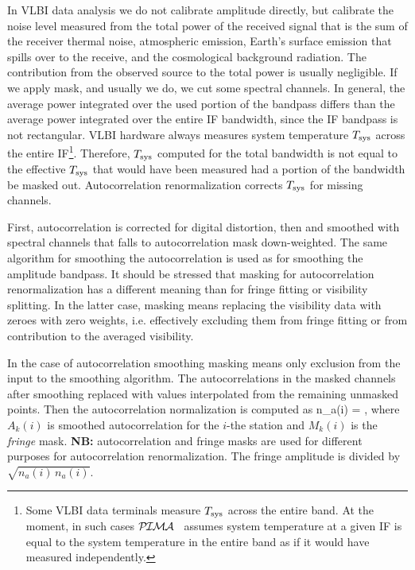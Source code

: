 \documentclass[11pt]{article}
\newcommand{\PIMA}{\textcolor{Dgreen}{$\cal P\hspace{-0.067em}I\hspace{-0.067em}M\hspace{-0.067em}A$} }
\begin{document}
  In VLBI data analysis we do not calibrate amplitude directly, but 
calibrate the noise level measured from the total power of the received 
signal that is the sum of the receiver thermal noise, atmospheric emission, 
Earth's surface emission that spills over to the receive, and the cosmological 
background radiation. The contribution from the observed source to the
total power is usually negligible. If we apply mask, and usually we do,
we cut some spectral channels. In general, the average power integrated 
over the used portion of the bandpass differs than the average power 
integrated over the entire IF bandwidth, since the IF bandpass is not 
rectangular. VLBI hardware always measures system temperature $T_{\rm sys}$ 
across the entire IF\footnote{Some VLBI data terminals measure $T_{\rm sys}$ 
across the entire band. At the moment, in such cases \PIMA\ assumes system 
temperature at a given IF is equal to the system temperature in the entire 
band as if it would have measured independently.}. Therefore, $T_{\rm sys}$ 
computed for the total bandwidth is not equal to the effective $T_{\rm sys}$ 
that would have been measured had a portion of the bandwidth be masked out. 
Autocorrelation renormalization corrects $T_{\rm sys}$ for missing channels.

  First, autocorrelation is corrected for digital distortion, then and 
smoothed with spectral channels that falls to autocorrelation mask down-weighted. 
The same algorithm for smoothing the autocorrelation is used as for smoothing 
the amplitude bandpass. It should be stressed that masking for autocorrelation
renormalization has a different meaning than for fringe fitting or visibility
splitting. In the latter case, masking means replacing the visibility
data with zeroes with zero weights, i.e. effectively excluding them from
fringe fitting or from contribution to the averaged visibility.

  In the case of autocorrelation smoothing masking means only exclusion from 
the input to the smoothing algorithm. The autocorrelations in the masked
channels after smoothing replaced with values interpolated from the remaining
unmasked points. Then the autocorrelation normalization is computed as
%
\beq
     n_a(i) = ,
%
   where $A_k(i)$ is smoothed autocorrelation for the $i$-the station
and $M_k(i)$ is the {\it fringe} mask. {\bf NB: } autocorrelation and fringe 
masks are used for different purposes for autocorrelation renormalization.
The fringe amplitude is divided by $\sqrt{n_a(i) \, n_a(i)}$.
\end{document}
